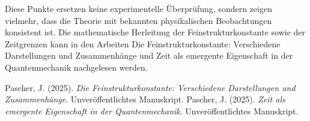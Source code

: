 \documentclass{article}
\begin{document}
	Diese Punkte ersetzen keine experimentelle Überprüfung, sondern zeigen vielmehr, dass die Theorie mit bekannten physikalischen Beobachtungen konsistent ist. Die mathematische Herleitung der Feinstrukturkonstante sowie der Zeitgrenzen kann in den Arbeiten Die Feinstrukturkonstante: Verschiedene Darstellungen und Zusammenhänge und Zeit als emergente Eigenschaft in der Quantenmechanik nachgelesen werden.
	

	
	\begin{thebibliography}{1}
		
		 Pascher, J. (2025). \textit{Die Feinstrukturkonstante: Verschiedene Darstellungen und Zusammenhänge}. Unveröffentlichtes Manuskript.
		 Pascher, J. (2025). \textit{Zeit als emergente Eigenschaft in der Quantenmechanik}. Unveröffentlichtes Manuskript.
		
	\end{thebibliography}
	
\end{document}
